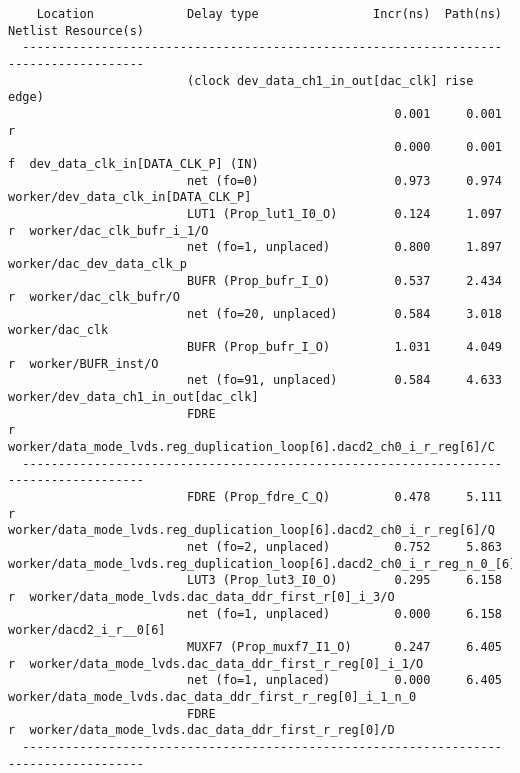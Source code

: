 \documentclass{article}
\begin{document}
\begin{lstlisting}
    Location             Delay type                Incr(ns)  Path(ns)    Netlist Resource(s)
  -------------------------------------------------------------------    -------------------
                         (clock dev_data_ch1_in_out[dac_clk] rise edge)
                                                      0.001     0.001 r  
                                                      0.000     0.001 f  dev_data_clk_in[DATA_CLK_P] (IN)
                         net (fo=0)                   0.973     0.974    worker/dev_data_clk_in[DATA_CLK_P]
                         LUT1 (Prop_lut1_I0_O)        0.124     1.097 r  worker/dac_clk_bufr_i_1/O
                         net (fo=1, unplaced)         0.800     1.897    worker/dac_dev_data_clk_p
                         BUFR (Prop_bufr_I_O)         0.537     2.434 r  worker/dac_clk_bufr/O
                         net (fo=20, unplaced)        0.584     3.018    worker/dac_clk
                         BUFR (Prop_bufr_I_O)         1.031     4.049 r  worker/BUFR_inst/O
                         net (fo=91, unplaced)        0.584     4.633    worker/dev_data_ch1_in_out[dac_clk]
                         FDRE                                         r  worker/data_mode_lvds.reg_duplication_loop[6].dacd2_ch0_i_r_reg[6]/C
  -------------------------------------------------------------------    -------------------
                         FDRE (Prop_fdre_C_Q)         0.478     5.111 r  worker/data_mode_lvds.reg_duplication_loop[6].dacd2_ch0_i_r_reg[6]/Q
                         net (fo=2, unplaced)         0.752     5.863    worker/data_mode_lvds.reg_duplication_loop[6].dacd2_ch0_i_r_reg_n_0_[6]
                         LUT3 (Prop_lut3_I0_O)        0.295     6.158 r  worker/data_mode_lvds.dac_data_ddr_first_r[0]_i_3/O
                         net (fo=1, unplaced)         0.000     6.158    worker/dacd2_i_r__0[6]
                         MUXF7 (Prop_muxf7_I1_O)      0.247     6.405 r  worker/data_mode_lvds.dac_data_ddr_first_r_reg[0]_i_1/O
                         net (fo=1, unplaced)         0.000     6.405    worker/data_mode_lvds.dac_data_ddr_first_r_reg[0]_i_1_n_0
                         FDRE                                         r  worker/data_mode_lvds.dac_data_ddr_first_r_reg[0]/D
  -------------------------------------------------------------------    -------------------


\end{lstlisting}
\end{document}
